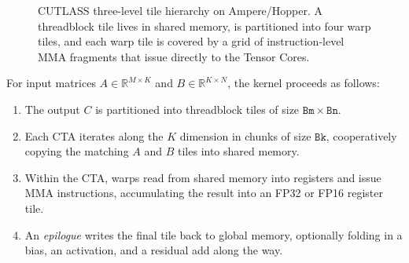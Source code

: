 \begin{figure}[H]
    \centering
    \caption{CUTLASS three-level tile hierarchy on Ampere/Hopper. A
             threadblock tile lives in shared memory, is partitioned
             into four warp tiles, and each warp tile is covered by
             a grid of instruction-level MMA fragments that issue
             directly to the Tensor Cores.}
    \label{fig:cutlass_tile_hierarchy}
\end{figure}

For input matrices
$A \in \mathbb{R}^{M \times K}$ and
$B \in \mathbb{R}^{K \times N}$, the kernel proceeds as follows:
\begin{enumerate}
    \item The output $C$ is partitioned into threadblock tiles of
          size $\mathtt{Bm} \times \mathtt{Bn}$.
    \item Each CTA iterates along the $K$ dimension in chunks of
          size $\mathtt{Bk}$, cooperatively copying the matching
          $A$ and $B$ tiles into shared memory.
    \item Within the CTA, warps read from shared memory into
          registers and issue MMA instructions, accumulating the
          result into an FP32 or FP16 register tile.
    \item An \emph{epilogue} writes the final tile back to global
          memory, optionally folding in a bias, an activation, and
          a residual add along the way.
\end{enumerate}


